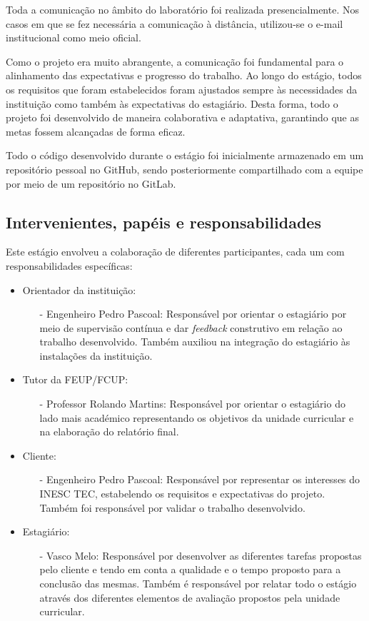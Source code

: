 Toda a comunicação no âmbito do laboratório foi realizada presencialmente. Nos casos em que se fez necessária a comunicação 
à distância, utilizou-se o e-mail institucional como meio oficial.

Como o projeto era muito abrangente, a comunicação foi fundamental para o alinhamento das expectativas e progresso do trabalho. Ao longo do estágio,
todos os requisitos que foram estabelecidos foram ajustados sempre às necessidades da instituição como também às expectativas do estagiário.
Desta forma, todo o projeto foi desenvolvido de maneira colaborativa e adaptativa, garantindo que as metas fossem alcançadas de forma eficaz.

Todo o código desenvolvido durante o estágio foi inicialmente armazenado em um repositório pessoal no GitHub, sendo 
posteriormente compartilhado com a equipe por meio de um repositório no GitLab.
	
	
\subsection{Intervenientes, papéis e responsabilidades}
Este estágio envolveu a colaboração de diferentes participantes, cada um com responsabilidades específicas:

\begin{itemize}
    \item Orientador da instituição:
    \begin{itemize}
        \item[-] Engenheiro Pedro Pascoal: Responsável por orientar o estagiário por meio de supervisão contínua e dar \textit{feedback} construtivo em 
        relação ao trabalho desenvolvido. Também auxiliou na integração do estagiário às instalações da instituição.
    \end{itemize}
    \item Tutor da FEUP/FCUP:
    \begin{itemize}
        \item[-] Professor Rolando Martins: Responsável por orientar o estagiário do lado mais académico representando os objetivos da unidade curricular e na elaboração
        do relatório final.
    \end{itemize}
    \item Cliente:
    \begin{itemize}
        \item[-] Engenheiro Pedro Pascoal: Responsável por representar os interesses do INESC TEC, estabelendo os requisitos e expectativas do projeto. Também foi
        responsável por validar o trabalho desenvolvido.
    \end{itemize}
    \item Estagiário:
    \begin{itemize}
        \item[-] Vasco Melo: Responsável por desenvolver as diferentes tarefas propostas pelo cliente e tendo em conta a qualidade e o tempo proposto para a conclusão das mesmas.
        Também é responsável por relatar todo o estágio através dos diferentes elementos de avaliação propostos pela unidade curricular.
    \end{itemize}
\end{itemize}

